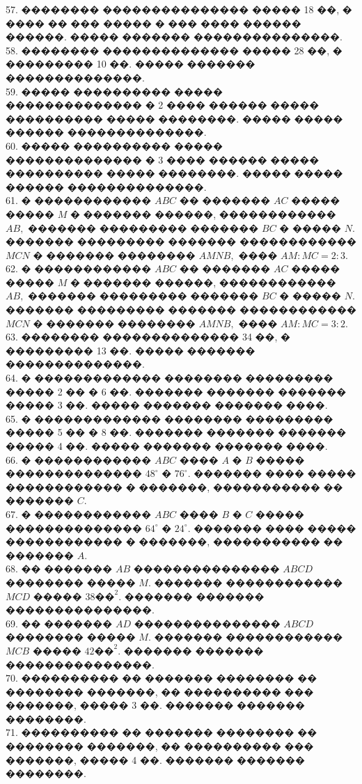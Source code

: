 \documentclass[12pt]{article}
\begin{document}
57. �������� ��������������� ����� 18 ��, � ���� �� ��� ����� � ��� ���� ������ ������. ����� ������� ���������������.\\
58. �������� �������������� ����� 28 ��, � ��������� 10 ��. ����� ������� ��������������.\\
59. ����� ���������� ����� �������������� � 2 ���� ������ ����� ���������� ����� ��������. ����� ����� ������ ��������������.\\
60. ����� ���������� ����� �������������� � 3 ���� ������ ����� ���������� ����� ��������. ����� ����� ������ ��������������.\\
61. � ������������ $ABC$ �� ������� $AC$ ����� ����� $M$ � ������� ������, ������������ $AB,$ ������� ��������� ������� $BC$ � ����� $N.$ ������� ��������� ������� ������������ $MCN$ � ������� �������� $AMNB,$ ���� $AM:MC=2:3.$\\
62. � ������������ $ABC$ �� ������� $AC$ ����� ����� $M$ � ������� ������, ������������ $AB,$ ������� ��������� ������� $BC$ � ����� $N.$ ������� ��������� ������� ������������ $MCN$ � ������� �������� $AMNB,$ ���� $AM:MC=3:2.$\\
63. �������� �������������� 34 ��, � ��������� 13 ��. ����� ������� ��������������.\\
64. � ������������� �������� ��������� ����� 2 �� � 6 ��. ������� ������� ������� ����� 3 ��. ����� ������� ������� ����.\\
65. � ������������� �������� ��������� ����� 5 �� � 8 ��. ������� ������� ������� ����� 4 ��. ����� ������� ������� ����.\\
66. � ������������ $ABC$ ���� $A$ � $B$ ����� �������������� $48^\circ$ � $76^\circ.$ ������� ���� ����� ������������ � �������, ����������� �� ������� $C.$\\
67. � ������������ $ABC$ ���� $B$ � $C$ ����� �������������� $64^\circ$ � $24^\circ.$ ������� ���� ����� ������������ � �������, ����������� �� ������� $A.$\\
68. �� ������� $AB$ ��������������� $ABCD$ �������� ����� $M.$ ������� ������������ $MCD$ ����� $38\text{��}^2.$ ������� ������� ���������������.\\
69. �� ������� $AD$ ��������������� $ABCD$ �������� ����� $M.$ ������� ������������ $MCB$ ����� $42\text{��}^2.$ ������� ������� ���������������.\\
70. ���������� �� ������� �������� �� �������� �������, �� ���������� ��� �������, ����� 3 ��. ������� ������� ��������.\\
71. ���������� �� ������� �������� �� �������� �������, �� ���������� ��� �������, ����� 4 ��. ������� ������� ��������.\\
\end{document}

